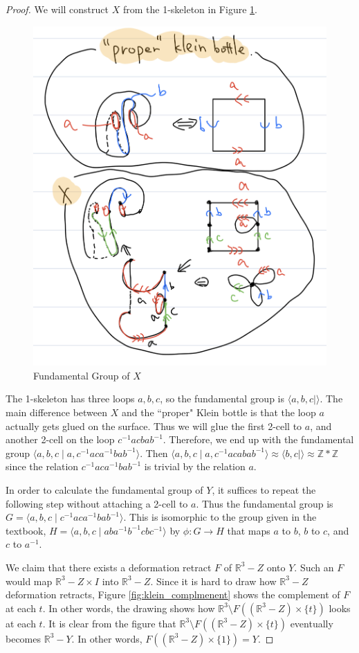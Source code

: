\documentclass[12pt, psamsfonts]{amsart}
\theoremstyle{definition}
\theoremstyle{remark}
\numberwithin{equation}{section}
\begin{document}
\begin{proof}
  We will construct $X$ from the 1-skeleton in Figure \ref{fig:fund_x_klein}.
  \begin{figure}
    \includegraphics[width=.5\linewidth]{klein_solution_zz.jpeg}
      \caption{Fundamental Group of $X$}
    \label{fig:fund_x_klein}
  \end{figure}
  The 1-skeleton has three loops $a, b, c$, so the fundamental group is $\langle a, b, c \mid \rangle$.
  The main difference between $X$ and the ``proper" Klein bottle is that the loop $a$ actually gets glued on the surface.
  Thus we will glue the first 2-cell to $a$, and another 2-cell on the loop $c^{-1}acbab^{-1}$.
  Therefore, we end up with the fundamental group $\langle a, b, c \mid a, c^{-1}aca^{-1}bab^{-1} \rangle$.
  Then $\langle a, b, c \mid a, c^{-1}acabab^{-1} \rangle \approx \langle b, c \mid \rangle \approx \mathbb{Z} * \mathbb{Z}$ since the relation $c^{-1}aca^{-1}bab^{-1}$ is trivial by the relation $a$.

  In order to calculate the fundamental group of $Y$, it suffices to repeat the following step without attaching a 2-cell to $a$.
  Thus the fundamental group is $G = \langle a, b, c \mid c^{-1}aca^{-1}bab^{-1} \rangle$.
  This is isomorphic to the group given in the textbook, $H = \langle a, b, c \mid aba^{-1}b^{-1}cbc^{-1} \rangle$ by $\phi: G \rightarrow H$ that maps $a$ to $b$, $b$ to $c$, and $c$ to $a^{-1}$.

  We claim that there exists a deformation retract $F$ of $\mathbb{R}^3 - Z$ onto $Y$.
  Such an $F$ would map $\mathbb{R}^3 - Z \times I$ into $\mathbb{R}^3 - Z$.
  Since it is hard to draw how $\mathbb{R}^3 - Z$ deformation retracts, Figure \ref{fig:klein_complmenent} shows the complement of $F$ at each $t$.
  In other words, the drawing shows how $\mathbb{R}^3 \setminus F((\mathbb{R}^3 - Z) \times \{ t \})$ looks at each $t$.
  It is clear from the figure that $\mathbb{R}^3 \setminus F((\mathbb{R}^3 - Z) \times \{ t \})$ eventually becomes $\mathbb{R}^3 - Y$.
  In other words, $F((\mathbb{R}^3 - Z) \times \{ 1 \}) = Y$.


\end{proof}
\end{document}
